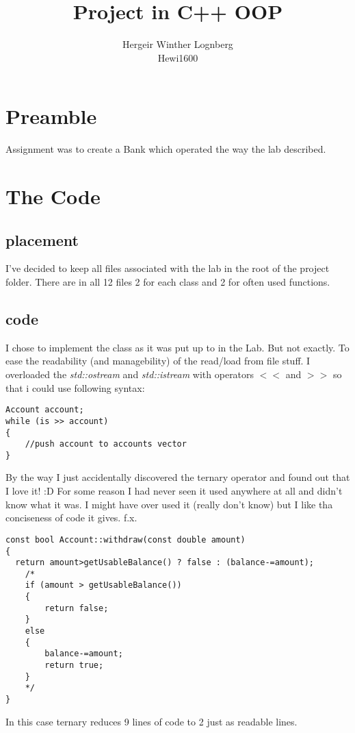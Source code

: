 \documentclass[11pt]{article}
\title{\textbf{Project in C++ OOP}}
\author{Hergeir Winther Lognberg \\
Hewi1600}
\date{}
\begin{document}
\maketitle

\section{Preamble}

Assignment was to create a Bank which operated the way the lab described.

\section{The Code}
\subsection{placement}
I've decided to keep all files associated with the lab in the root of the project folder. There are in all 12 files 2 for each class and 2 for often used functions. 

\subsection{code}
I chose to implement the class as it was put up to in the Lab. But not exactly. To ease the readability (and managebility) of the read/load from file stuff. I overloaded the \emph{std::ostream} and \emph{std::istream} with operators  $<<$ and $>>$ so that i could use following syntax:

\begin{lstlisting}
Account account;
while (is >> account)
{
	//push account to accounts vector
}\end{lstlisting}


By the way I just accidentally discovered the ternary operator and found out that I love it! :D 
For some reason I had never seen it used anywhere at all and didn't know what it was. I might have over used it (really don't know)
but I like tha conciseness of code it gives. f.x.
\newpage
\begin{lstlisting}
const bool Account::withdraw(const double amount)
{
  return amount>getUsableBalance() ? false : (balance-=amount);
	/*
	if (amount > getUsableBalance())
	{
		return false;
	}
	else
	{
		balance-=amount;
		return true;
	}
	*/
}
\end{lstlisting}

In this case ternary reduces 9 lines of code to 2 just as readable lines.
\end{document}
